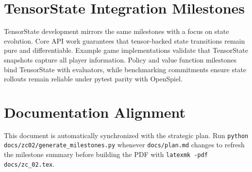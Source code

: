 \documentclass{article}
\begin{document}
\section{TensorState Integration Milestones}
TensorState development mirrors the same milestones with a focus on state evolution. Core API work guarantees that tensor-backed
state transitions remain pure and differentiable. Example game implementations validate that TensorState snapshots capture all
player information. Policy and value function milestones bind TensorState with evaluators, while benchmarking commitments ensure
state rollouts remain reliable under pytest parity with OpenSpiel.

\section{Documentation Alignment}
This document is automatically synchronized with the strategic plan. Run
\texttt{python docs/zc02/generate\_milestones.py} whenever \texttt{docs/plan.md} changes to refresh the milestone summary before
building the PDF with \texttt{latexmk -pdf docs/zc\_02.tex}.
\end{document}
